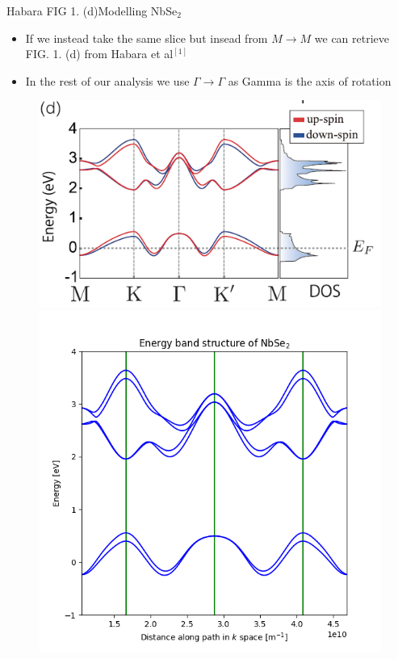 \documentclass[9pt]{beamer}
\begin{document}
\begin{frame}{Habara FIG 1. (d)}{Modelling NbSe$_2$}
  \begin{itemize}
    \item If we instead take the same slice but insead from $M \rightarrow M$ we can retrieve FIG. 1. (d) from Habara et al$^{[1]}$

    \item In the rest of our analysis we use $\Gamma \rightarrow \Gamma$ as Gamma is the axis of rotation
  \end{itemize}

  \begin{figure}
  \centering
  \begin{minipage}{.5\textwidth}
    \centering
    \includegraphics[width=.9\linewidth]{Habara_evalues.png}
  \end{minipage}%
  \begin{minipage}{.5\textwidth}
    \centering
    \includegraphics[width=.9\linewidth]{our_Habara_evalues.png}
  \end{minipage}
  \end{figure}
\end{frame}
\end{document}
